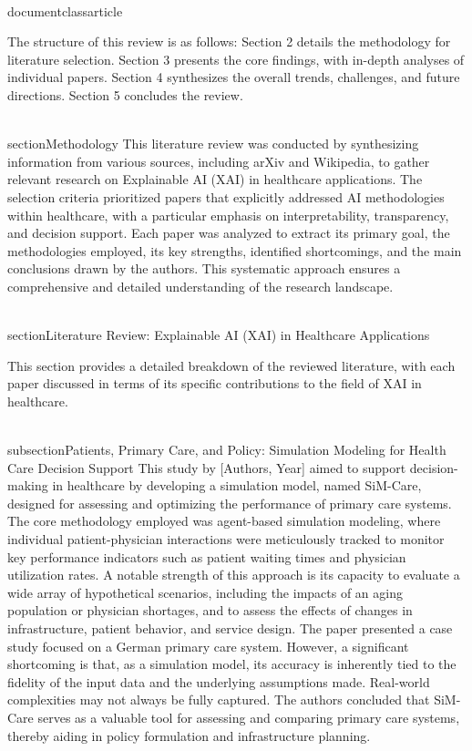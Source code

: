 \\documentclass{article}
\begin{document}
The structure of this review is as follows: Section 2 details the methodology for literature selection. Section 3 presents the core findings, with in-depth analyses of individual papers. Section 4 synthesizes the overall trends, challenges, and future directions. Section 5 concludes the review.

\\section{Methodology}
This literature review was conducted by synthesizing information from various sources, including arXiv and Wikipedia, to gather relevant research on Explainable AI (XAI) in healthcare applications. The selection criteria prioritized papers that explicitly addressed AI methodologies within healthcare, with a particular emphasis on interpretability, transparency, and decision support. Each paper was analyzed to extract its primary goal, the methodologies employed, its key strengths, identified shortcomings, and the main conclusions drawn by the authors. This systematic approach ensures a comprehensive and detailed understanding of the research landscape.

\\section{Literature Review: Explainable AI (XAI) in Healthcare Applications}

This section provides a detailed breakdown of the reviewed literature, with each paper discussed in terms of its specific contributions to the field of XAI in healthcare.

\\subsection{Patients, Primary Care, and Policy: Simulation Modeling for Health Care Decision Support}
This study by [Authors, Year] aimed to support decision-making in healthcare by developing a simulation model, named SiM-Care, designed for assessing and optimizing the performance of primary care systems. The core methodology employed was agent-based simulation modeling, where individual patient-physician interactions were meticulously tracked to monitor key performance indicators such as patient waiting times and physician utilization rates. A notable strength of this approach is its capacity to evaluate a wide array of hypothetical scenarios, including the impacts of an aging population or physician shortages, and to assess the effects of changes in infrastructure, patient behavior, and service design. The paper presented a case study focused on a German primary care system. However, a significant shortcoming is that, as a simulation model, its accuracy is inherently tied to the fidelity of the input data and the underlying assumptions made. Real-world complexities may not always be fully captured. The authors concluded that SiM-Care serves as a valuable tool for assessing and comparing primary care systems, thereby aiding in policy formulation and infrastructure planning.
\end{document}
